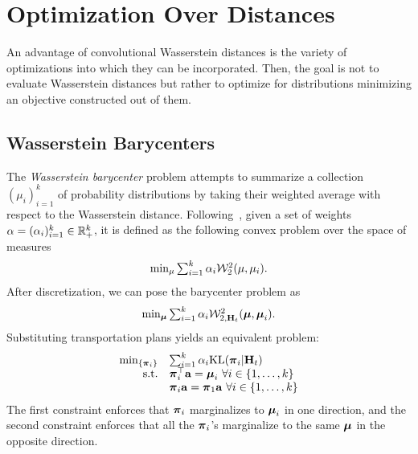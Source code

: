 
\section{Optimization Over Distances}\label{sec:optim_over_dist}

An advantage of convolutional Wasserstein distances is the variety of optimizations into which they can be incorporated.  Then, the goal is not to evaluate Wasserstein distances but rather to optimize for distributions minimizing an objective constructed out of them.



\subsection{Wasserstein Barycenters}\label{sec:barycenters}


The \emph{Wasserstein barycenter} problem attempts to summarize a collection $(\mu_{i})_{i=1}^k$ of probability distributions by taking their weighted average with respect to the Wasserstein distance. Following~\cite{agueh-2011}, given a set of weights $\alpha=(\alpha_i)_{i=1}^k \in \mathbb{R}_+^k$, it is defined as the following convex problem over the space of measures
\begin{equation}\label{eq:bary-continuous}
	\textstyle\min_{\mu} \sum_{i=1}^k \alpha_i \mathcal W_2^2(\mu,\mu_i).
\end{equation}
After discretization, we can pose the barycenter problem as 
\begin{equation}
\textstyle\min_{\boldsymbol{\mu}}  \sum_{i=1}^k \alpha_i\mathcal W^2_{2,\mathbf{H}_t}(\boldsymbol{\mu},\boldsymbol{\mu}_i).
\end{equation}
Substituting transportation plans yields an equivalent problem:
$$
\begin{array}{rl}
\min_{\{\boldsymbol{\pi}_i\}} & \sum_{i=1}^k \alpha_i\mathrm{KL}(\boldsymbol{\pi}_i|\mathbf{H}_t)\\
\textrm{s.t.}
&\boldsymbol{\pi}_i^\top \mathbf a = \boldsymbol{\mu}_i\ \forall i\in\{1,\ldots,k\}\\
&\boldsymbol{\pi}_i \mathbf a=\boldsymbol{\pi}_1\mathbf a \ \forall i\in\{1,\ldots,k\}\\
\end{array}
$$
The first constraint enforces that $\boldsymbol{\pi}_i$ marginalizes to $\boldsymbol{\mu}_i$ in one direction, and the second constraint enforces that all the $\boldsymbol{\pi}_i$'s marginalize to the same $\boldsymbol{\mu}$ in the opposite direction.


